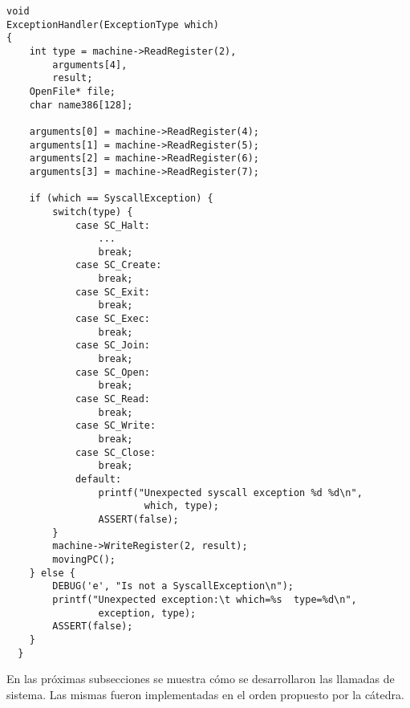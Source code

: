 \begin{lstlisting}[style=C]
void
ExceptionHandler(ExceptionType which)
{
    int type = machine->ReadRegister(2),
        arguments[4],
        result;
    OpenFile* file;
    char name386[128];

    arguments[0] = machine->ReadRegister(4);
    arguments[1] = machine->ReadRegister(5);
    arguments[2] = machine->ReadRegister(6);
    arguments[3] = machine->ReadRegister(7);

    if (which == SyscallException) {
    	switch(type) {
            case SC_Halt:
                ...
                break;
            case SC_Create:
                break;
            case SC_Exit:
                break;
            case SC_Exec:
                break;
            case SC_Join:
                break;
            case SC_Open:
                break;
            case SC_Read:
                break;
            case SC_Write:
                break;
            case SC_Close:
                break;
            default: 
                printf("Unexpected syscall exception %d %d\n",
                        which, type);
                ASSERT(false);
    	}
        machine->WriteRegister(2, result);
    	movingPC();
    } else {
        DEBUG('e', "Is not a SyscallException\n");
        printf("Unexpected exception:\t which=%s  type=%d\n",
                exception, type);
        ASSERT(false);
    }
  }
\end{lstlisting}
En las próximas subsecciones se muestra cómo se desarrollaron las llamadas de sistema. Las mismas fueron implementadas en el orden propuesto por la cátedra.
